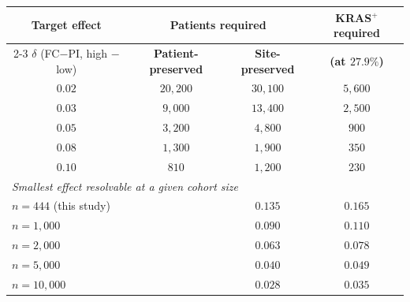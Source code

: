\begin{tabular}{c c c c}
\toprule
\textbf{Target effect} &
  \multicolumn{2}{c}{\textbf{Patients required}} &
  \textbf{KRAS$^{+}$ required} \\
\cmidrule(lr){2-3}
$\delta$ (FC${-}$PI, high ${-}$ low) &
  \textbf{Patient-preserved} & \textbf{Site-preserved} &
  \textbf{(at $27.9\%$)} \\
\midrule
$0.02$ & $20{,}200$ & $30{,}100$ & $5{,}600$ \\
$0.03$ & $9{,}000$  & $13{,}400$ & $2{,}500$ \\
$0.05$ & $3{,}200$  & $4{,}800$  & $900$ \\
$0.08$ & $1{,}300$  & $1{,}900$  & $350$ \\
$0.10$ & $810$      & $1{,}200$  & $230$ \\
\midrule
\multicolumn{4}{l}{\emph{Smallest effect resolvable at a given cohort size}} \\
\multicolumn{2}{l}{$n\!=\!444$ (this study)} & $0.135$ & $0.165$ \\
\multicolumn{2}{l}{$n\!=\!1{,}000$}         & $0.090$ & $0.110$ \\
\multicolumn{2}{l}{$n\!=\!2{,}000$}         & $0.063$ & $0.078$ \\
\multicolumn{2}{l}{$n\!=\!5{,}000$}         & $0.040$ & $0.049$ \\
\multicolumn{2}{l}{$n\!=\!10{,}000$}        & $0.028$ & $0.035$ \\
\bottomrule
\end{tabular}
